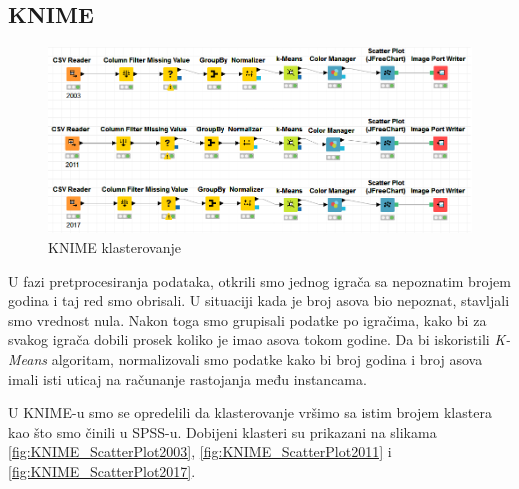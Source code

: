 \documentclass[a4paper]{article}
\begin{document}
\subsection{KNIME}

\begin{figure}[H]
	\begin{center}
		\includegraphics[width=1\textwidth]{Klasterovanje/KNIME_Cvorovi.png}
	\end{center}
	\caption{KNIME klasterovanje}
	\label{fig:KNIME_CvoroviKlasterovanje}
\end{figure}

U fazi pretprocesiranja podataka, otkrili smo jednog igrača sa nepoznatim brojem godina i taj red smo obrisali. U situaciji kada je broj asova bio nepoznat, stavljali smo vrednost nula. Nakon toga smo grupisali podatke po igračima, kako bi za svakog igrača dobili prosek koliko je imao asova tokom godine. Da bi iskoristili \textit{K-Means} algoritam, normalizovali smo podatke kako bi broj godina i broj asova imali isti uticaj na računanje rastojanja među instancama.  

U KNIME-u smo se opredelili da klasterovanje vršimo sa istim brojem klastera kao što smo činili u SPSS-u. Dobijeni klasteri su prikazani na slikama \ref{fig:KNIME_ScatterPlot2003}, \ref{fig:KNIME_ScatterPlot2011} i \ref{fig:KNIME_ScatterPlot2017}.
\end{document}
